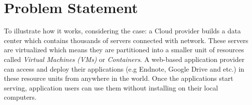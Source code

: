 

\section{Problem Statement}






To illustrate how it works, considering the case: a Cloud provider builds a data center which contains thousands of servers connected with network. These servers are virtualized which means they are partitioned into a smaller unit of resources called \emph{Virtual Machines (VMs)} or \emph{Containers}. A web-based application provider can access and deploy their applications (e.g Endnote, Google Drive and etc.) in these resource units from anywhere in the world. Once the applications start serving, application users can use them without installing on their local computers.

